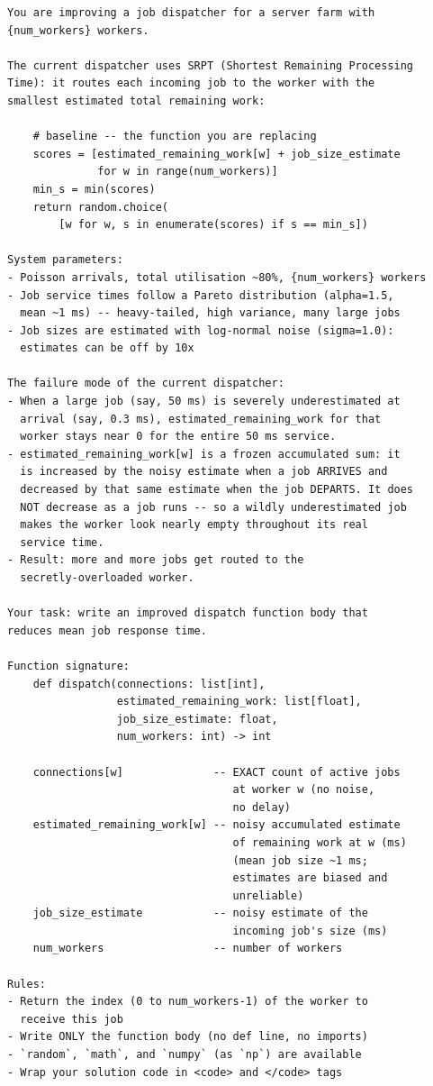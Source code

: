 \documentclass[11pt]{article}
\begin{document}
\begin{lstlisting}
You are improving a job dispatcher for a server farm with
{num_workers} workers.

The current dispatcher uses SRPT (Shortest Remaining Processing
Time): it routes each incoming job to the worker with the
smallest estimated total remaining work:

    # baseline -- the function you are replacing
    scores = [estimated_remaining_work[w] + job_size_estimate
              for w in range(num_workers)]
    min_s = min(scores)
    return random.choice(
        [w for w, s in enumerate(scores) if s == min_s])

System parameters:
- Poisson arrivals, total utilisation ~80%, {num_workers} workers
- Job service times follow a Pareto distribution (alpha=1.5,
  mean ~1 ms) -- heavy-tailed, high variance, many large jobs
- Job sizes are estimated with log-normal noise (sigma=1.0):
  estimates can be off by 10x

The failure mode of the current dispatcher:
- When a large job (say, 50 ms) is severely underestimated at
  arrival (say, 0.3 ms), estimated_remaining_work for that
  worker stays near 0 for the entire 50 ms service.
- estimated_remaining_work[w] is a frozen accumulated sum: it
  is increased by the noisy estimate when a job ARRIVES and
  decreased by that same estimate when the job DEPARTS. It does
  NOT decrease as a job runs -- so a wildly underestimated job
  makes the worker look nearly empty throughout its real
  service time.
- Result: more and more jobs get routed to the
  secretly-overloaded worker.

Your task: write an improved dispatch function body that
reduces mean job response time.

Function signature:
    def dispatch(connections: list[int],
                 estimated_remaining_work: list[float],
                 job_size_estimate: float,
                 num_workers: int) -> int

    connections[w]              -- EXACT count of active jobs
                                   at worker w (no noise,
                                   no delay)
    estimated_remaining_work[w] -- noisy accumulated estimate
                                   of remaining work at w (ms)
                                   (mean job size ~1 ms;
                                   estimates are biased and
                                   unreliable)
    job_size_estimate           -- noisy estimate of the
                                   incoming job's size (ms)
    num_workers                 -- number of workers

Rules:
- Return the index (0 to num_workers-1) of the worker to
  receive this job
- Write ONLY the function body (no def line, no imports)
- `random`, `math`, and `numpy` (as `np`) are available
- Wrap your solution code in <code> and </code> tags
\end{lstlisting}
\end{document}
